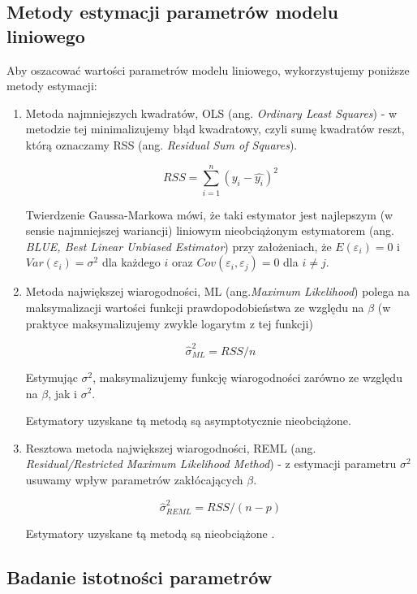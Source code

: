 \documentclass[12pt]{mwbk}
\theoremstyle{plain}
\theoremstyle{definition}
\theoremstyle{remark}
\begin{document}
\subsection{Metody estymacji parametrów modelu liniowego}
Aby oszacować wartości parametrów modelu liniowego, wykorzystujemy poniższe metody estymacji:
\begin{enumerate}
	\item Metoda najmniejszych kwadratów, OLS (ang. \emph{Ordinary Least Squares}) - w metodzie tej minimalizujemy błąd kwadratowy, czyli sumę kwadratów reszt, którą oznaczamy RSS (ang. \emph{Residual Sum of Squares}).
	
	$$RSS= \sum_{i=1}^{n}(y_i-\hat{y_i})^2$$
	
	Twierdzenie Gaussa-Markowa mówi, że taki estymator jest najlepszym (w sensie najmniejszej wariancji) liniowym nieobciążonym estymatorem (ang. \textit{BLUE, Best Linear Unbiased Estimator}) przy założeniach, że $E(\varepsilon_i)=0$ i $Var(\varepsilon_i)=\sigma^2$ dla każdego $i$ oraz $Cov(\varepsilon_i, \varepsilon_j)=0$ dla $i \neq j$.

	\item Metoda największej wiarogodności, ML (ang.\textit{Maximum Likelihood}) polega na maksymalizacji wartości funkcji prawdopodobieństwa ze względu na $\beta$ (w praktyce maksymalizujemy zwykle logarytm z tej funkcji)
	
	$$\hat{\sigma}^{2}_{ML}=RSS/n$$
	
	Estymując $\sigma^2$, maksymalizujemy funkcję wiarogodności zarówno ze względu na $\beta$, jak i $\sigma^2$.
	
	Estymatory uzyskane tą metodą są asymptotycznie nieobciążone.
	
	\item Resztowa metoda największej wiarogodności, REML (ang. \textit{Residual/Restricted Maximum Likelihood Method}) - z estymacji parametru $\sigma^2$ usuwamy wpływ parametrów zakłócających $\beta$.
	
	$$\hat{\sigma}^2_{REML}=RSS/(n-p)$$
	
	Estymatory uzyskane tą metodą są nieobciążone \cite{biecek}.
\end{enumerate}
\begin{center}
\end{center}
\subsection{Badanie istotności parametrów}
\end{document}
